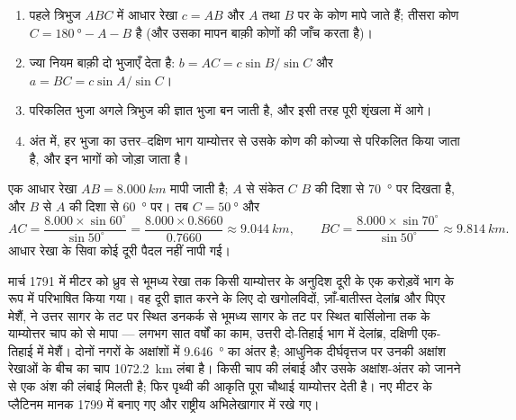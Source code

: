 \begin{method}[त्रिभुजन शृंखला का परिकलन]\label{met:g10:measuring-the-earth:chain}
\begin{enumerate}
  \item पहले त्रिभुज $ABC$ में आधार रेखा $c = AB$ और
        $A$ तथा $B$ पर के कोण मापे जाते हैं; तीसरा कोण
        $C = \qty{180}{\degree} - A - B$ है (और उसका मापन बाक़ी कोणों की
        जाँच करता है)।
  \item ज्या नियम बाक़ी दो भुजाएँ देता है:
        $b = AC = c \sin B / \sin C$ और $a = BC = c \sin A / \sin C$।
  \item परिकलित भुजा अगले त्रिभुज की ज्ञात भुजा बन जाती है, और इसी तरह पूरी
        शृंखला में आगे।
  \item अंत में, हर भुजा का उत्तर--दक्षिण भाग याम्योत्तर से उसके कोण की कोज्या से
        परिकलित किया जाता है, और इन भागों को जोड़ा जाता है।
\end{enumerate}
\end{method}

\begin{example}[एक त्रिभुज]\label{ex:g10:measuring-the-earth:triangle}
एक आधार रेखा $AB = \qty{8.000}{km}$ मापी जाती है; $A$ से संकेत $C$
$B$ की दिशा से \qty{70}{\degree} पर दिखता है, और $B$ से
$A$ की दिशा से \qty{60}{\degree} पर। तब $C = \qty{50}{\degree}$ और
\[
  AC = \frac{8.000 \times \sin 60^\circ}{\sin 50^\circ} = \frac{8.000 \times 0.8660}{0.7660}
  \approx \qty{9.044}{km}, \qquad
  BC = \frac{8.000 \times \sin 70^\circ}{\sin 50^\circ} \approx \qty{9.814}{km}.
\]
आधार रेखा के सिवा कोई दूरी पैदल नहीं नापी गई।
\end{example}

\begin{example}[मीटर का याम्योत्तर]\label{ex:g10:measuring-the-earth:meridian}
मार्च 1791 में मीटर को ध्रुव से भूमध्य रेखा तक किसी याम्योत्तर के अनुदिश दूरी के
एक करोड़वें भाग के रूप में परिभाषित किया गया। वह दूरी ज्ञात करने के लिए दो खगोलविदों,
ज़ाँ-बातीस्त देलांब्र और पिएर मेशैं, ने उत्तर सागर के तट पर स्थित डनकर्क से भूमध्य सागर के
तट पर स्थित बार्सिलोना तक के याम्योत्तर चाप को  से मापा --- लगभग सात वर्षों का
काम, उत्तरी दो-तिहाई भाग में देलांब्र, दक्षिणी एक-तिहाई में मेशैं। दोनों नगरों के अक्षांशों में
\qty{9.646}{\degree} का अंतर है; आधुनिक दीर्घवृत्तज पर उनकी अक्षांश रेखाओं के बीच का चाप
\qty{1072.2}{km} लंबा है। किसी चाप की लंबाई और उसके अक्षांश-अंतर को जानने से एक अंश की
लंबाई मिलती है; फिर पृथ्वी की आकृति पूरा चौथाई याम्योत्तर देती है। नए मीटर के प्लैटिनम
मानक 1799 में बनाए गए और राष्ट्रीय अभिलेखागार में रखे गए।
\end{example}

